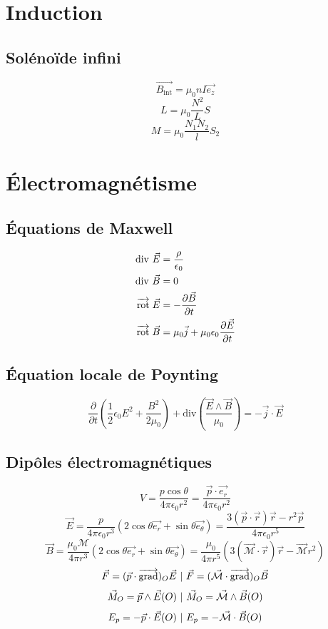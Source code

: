 \documentclass[]{article}
\begin{document}
\section{Induction}

\subsection*{Solénoïde infini}
\[ \overrightarrow{B_{\text{int}}} = \mu_0 n I \vec{e_z} \]
\[ L = \mu_0 \frac{N^2}{L}S \]
\[ M = \mu_0 \frac{N_1 N_2}{l} S_2 \]

\section{Électromagnétisme}

\subsection*{Équations de Maxwell}
\begin{align*}
    \text{div } \vec{E} &= \frac{\rho}{\epsilon_0} \\
    \text{div } \vec{B} &= 0 \\
    \overrightarrow{\text{rot}} \; \vec{E} &= -\frac{\partial \vec{B}}{\partial t} \\
    \overrightarrow{\text{rot}} \; \vec{B} &= \mu_0 \vec{j} + \mu_0 \epsilon_0 \frac{\partial \vec{E}}{\partial t}
\end{align*}

\subsection*{Équation locale de Poynting}

\[ \frac{\partial}{\partial t} \left( \frac{1}{2}\epsilon_0 E^2 + \frac{B^2}{2\mu_0} \right) + \text{div}\left( \frac{\vec{E} \wedge \vec{B}}{\mu_0} \right) = - \vec{j} \cdot \vec{E} \]

\subsection*{Dipôles électromagnétiques}
\[ V = \frac{p \cos \theta}{4 \pi \epsilon_0 r^2} = \frac{\vec{p}\cdot\vec{e_r}}{4\pi\epsilon_0 r^2} \]
\[ \vec{E} = \frac{p}{4 \pi\epsilon_0r^3}(2 \cos \theta \vec{e_r} + \sin \theta \vec{e_{\theta}}) = \frac{3(\vec{p} \cdot \vec{r})\vec{r} - r^2\vec{p}}{4\pi\epsilon_0r^5} \]
\[ \vec{B} = \frac{\mu_0 \mathcal{M}}{4 \pi r^3}(2 \cos\theta \vec{e_r} + \sin\theta \vec{e_\theta}) = \frac{\mu_0}{4 \pi r^5} (3(\vec{\mathcal{M}} \cdot \vec{r})\vec{r} - \vec{\mathcal{M}}r^2) \]
\[ \vec{F} = (\vec{p}\cdot\overrightarrow{{\text{grad}}})_O \vec{E} \text{ } | \text{ } \vec{F} = (\vec{\mathcal{M}}\cdot\overrightarrow{{\text{grad}}})_O \vec{B} \]
\[ \vec{M}_O = \vec{p} \wedge \vec{E}(O)\text{ } | \text{ } \vec{M}_O = \vec{\mathcal{M}} \wedge \vec{B}(O)  \]
\[ E_p = - \vec{p} \cdot \vec{E}(O)\text{ } | \text{ } E_p = - \vec{\mathcal{M}} \cdot \vec{B}(O) \]
\end{document}

